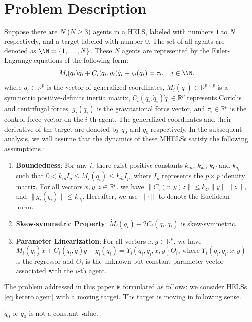 
\section{Problem Description}
\label{sec problem}

Suppose there are $N$ ($N\geq 3$) agents in a HELS, labeled with numbers $1$ to  $N$ respectively, and a target labeled with number 0.
The set of all agents are denoted as $\NN=\{1,\dots,N\}$.
These $N$ agents are represented by the Euler-Lagrange equations of the following form:
\begin{equation}	
    M_i(q_i)\ddot{q}_i+C_i(q_i,\dot{q}_i)\dot{q}_i+g_i(q_i)=\tau_i,\quad i \in\NN,
    \label{eq hetero agent}
\end{equation}
where $q_i\in\mathbb{R}^p$ is the vector of generalized coordinates,
$M_i(q_i)\in\mathbb{R}^{p\times p}$ is a symmetric positive-definite inertia matrix,
$C_i(q_i,\dot{q}_i)\dot{q}_i\in\mathbb{R}^p$ represents Coriolis and centrifugal forces,
$g_i(q_i)$ is the gravitational force vector,
and $\tau_i\in\mathbb{R}^p$ is the control force vector on the $i$-th agent.
The generalized coordinates and their derivative of the target are denoted by $q_0$ and $\dot{q}_0$ respectively.
In the subsequent analysis, we will assume that the dynamics of these MHELSs satisfy the following assumptions \cite{spongRobotModelingControl2020}:
\begin{enumerate}
    \item[A1] \textbf{Boundedness}: For any $i$, there exist positive constants $k_{\underline m}$, $k_{\overline{m}}$, $k_{C}$ and $k_{g_{i}}$ such that $0 < k_{\underline{m}}I_{p}\leq M_{i}(q_{i})\leq k_{\overline{m}}I_{p}$, where $I_{p}$ represents the $p\times p$ identity matrix. For all vectors $x,y,z\in\mathbb{R}^p$, we have $\|C_i(x,y)z\|\leq k_{C}\|y\|\|z\|$, and $\|g_i(q_i)\|\leq k_{g_i}$. Hereafter, we use $\|\cdot\|$ to denote the Euclidean norm.
    \item[A2] \textbf{Skew-symmetric Property}: $\dot{M}_i(q_{i}) - 2C_{i}(q_{i},\dot{q}_{i})$ is skew-symmetric.
    \item[A3] \textbf{Parameter Linearization}: For all vectors $x,y\in\mathbb{R}^{p}$, we have $M_i(q_i)x + C_i(q_i,\dot{q})y + g_i(q_i)=Y_{i}(q_{i},\dot{q}_{i},x,y)\Theta_{i}$, where $Y_i(q_{i},\dot{q}_{i},x,y)$ is the regressor and $\Theta_i$ is the unknown but constant parameter vector associated with the $i$-th agent.
\end{enumerate}


The problem addressed in this paper is formulated as follows: 
we consider HELSs \eqref{eq hetero agent} with a moving target.
The  target is moving in following sense.
\begin{assumption}
    $\ddot{q}_0$ or $\dot{q}_0$ is not a  constant value.
    \label{assump: not constant}
\end{assumption}


